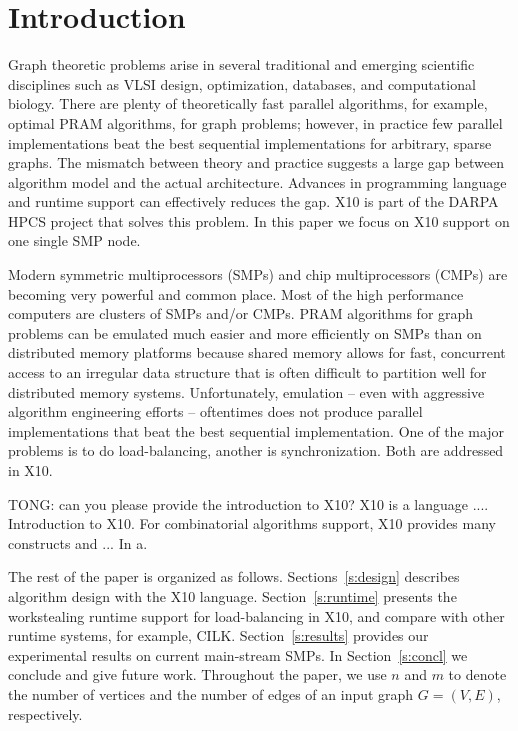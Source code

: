 
\section{Introduction}
\label{s:intr}
 Graph theoretic problems arise in several traditional and emerging scientific disciplines such as VLSI design, optimization, databases, and computational biology. There are plenty of theoretically fast parallel algorithms, for example, optimal PRAM algorithms, for graph problems; however, in
 practice few parallel implementations beat the best sequential implementations for arbitrary, sparse
 graphs. The mismatch between theory and practice suggests a large gap between algorithm model and the actual architecture. Advances in programming language and runtime support can effectively reduces the gap.
 X10 is part of the DARPA HPCS project that solves this problem.  In this paper we focus on X10 support on one single SMP node.
 
 Modern symmetric multiprocessors (SMPs) and chip multiprocessors (CMPs) 
 are becoming very powerful and common place. Most of the high performance
 computers are clusters of SMPs and/or CMPs. PRAM algorithms for graph problems can be emulated much easier and more
 efficiently on SMPs than on distributed memory platforms because shared memory allows for fast, concurrent access
to an irregular data structure that is often difficult to partition well for distributed memory systems. 
 Unfortunately, emulation -- even with aggressive algorithm engineering efforts --
 oftentimes does not produce parallel implementations that beat the
 best sequential implementation. One of the major problems is to do load-balancing, another is synchronization. Both are addressed in X10.
 
 {TONG: can you please provide the introduction to X10}? X10 is a language .... Introduction to X10.  For combinatorial algorithms support, X10 provides many constructs and ...
 In a.   

 The rest of the paper is organized as follows. Sections~\ref{s:design} describes algorithm design with the X10 language.
 Section~\ref{s:runtime} presents the workstealing runtime support for load-balancing in X10, and compare with other runtime systems, for example, CILK. 
 Section~\ref{s:results} provides our experimental results on current main-stream SMPs.
 In Section~\ref{s:concl} we conclude and give future work. 
 Throughout the paper, we
 use $n$ and $m$ to denote the number of vertices and the number of
 edges of an input graph $G=(V,E)$, respectively. 
  



